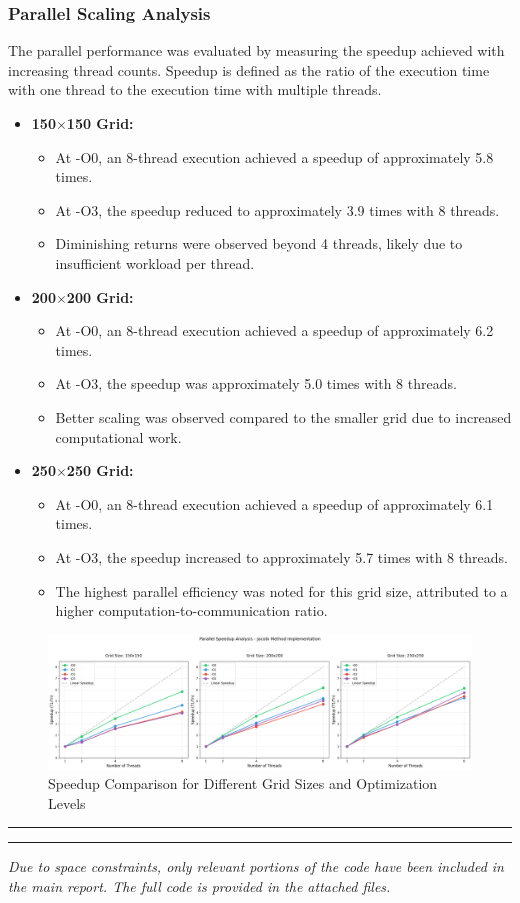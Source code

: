\documentclass{article}
\begin{document}
\subsubsection{Parallel Scaling Analysis}

The parallel performance was evaluated by measuring the speedup achieved with increasing thread counts. Speedup is defined as the ratio of the execution time with one thread to the execution time with multiple threads.

\begin{itemize}
    \item \textbf{150$\times$150 Grid:}
    \begin{itemize}
        \item At -O0, an 8-thread execution achieved a speedup of approximately 5.8 times.
        \item At -O3, the speedup reduced to approximately 3.9 times with 8 threads.
        \item Diminishing returns were observed beyond 4 threads, likely due to insufficient workload per thread.
    \end{itemize}
    
    \item \textbf{200$\times$200 Grid:}
    \begin{itemize}
        \item At -O0, an 8-thread execution achieved a speedup of approximately 6.2 times.
        \item At -O3, the speedup was approximately 5.0 times with 8 threads.
        \item Better scaling was observed compared to the smaller grid due to increased computational work.
    \end{itemize}
    
    \item \textbf{250$\times$250 Grid:}
    \begin{itemize}
        \item At -O0, an 8-thread execution achieved a speedup of approximately 6.1 times.
        \item At -O3, the speedup increased to approximately 5.7 times with 8 threads.
        \item The highest parallel efficiency was noted for this grid size, attributed to a higher computation-to-communication ratio.
    \end{itemize}
\end{itemize}

\begin{figure}[H]
    \centering
    \includegraphics[width=\linewidth]{Images/Plot2.png}
    \caption{Speedup Comparison for Different Grid Sizes and Optimization Levels}
    \label{fig:plot2}
\end{figure}

\rule{\linewidth}{0.5pt}

\printbibliography

\hrule

\textit{Due to space constraints, only relevant portions of the code have been included in the main report. The full code is provided in the attached files.}
\end{document}
